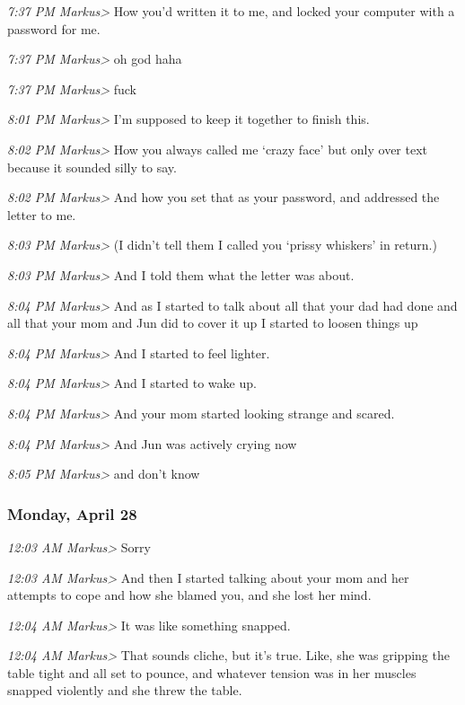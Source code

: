 {\emph{7:37 PM Markus\textgreater{}} How you'd written it to me, and
locked your computer with a password for me.

\emph{7:37 PM Markus\textgreater{}} oh god haha

\emph{7:37 PM Markus\textgreater{}} fuck

\emph{8:01 PM Markus\textgreater{}} I'm supposed to keep it together to
finish this.

\emph{8:02 PM Markus\textgreater{}} How you always called me `crazy
face' but only over text because it sounded silly to say.

\emph{8:02 PM Markus\textgreater{}} And how you set that as your
password, and addressed the letter to me.

\emph{8:03 PM Markus\textgreater{}} (I didn't tell them I called you
`prissy whiskers' in return.)

\emph{8:03 PM Markus\textgreater{}} And I told them what the letter was
about.

\emph{8:04 PM Markus\textgreater{}} And as I started to talk about all
that your dad had done and all that your mom and Jun did to cover it up
I started to loosen things up

\emph{8:04 PM Markus\textgreater{}} And I started to feel lighter.

\emph{8:04 PM Markus\textgreater{}} And I started to wake up.

\emph{8:04 PM Markus\textgreater{}} And your mom started looking strange
and scared.

\emph{8:04 PM Markus\textgreater{}} And Jun was actively crying now

\emph{8:05 PM Markus\textgreater{}} and don't know

\subsubsection*{Monday, April 28}\label{monday-april-28}

\emph{12:03 AM Markus\textgreater{}} Sorry

\emph{12:03 AM Markus\textgreater{}} And then I started talking about
your mom and her attempts to cope and how she blamed you, and she lost
her mind.

\emph{12:04 AM Markus\textgreater{}} It was like something snapped.

\emph{12:04 AM Markus\textgreater{}} That sounds cliche, but it's true.
Like, she was gripping the table tight and all set to pounce, and
whatever tension was in her muscles snapped violently and she threw the
table.

}
